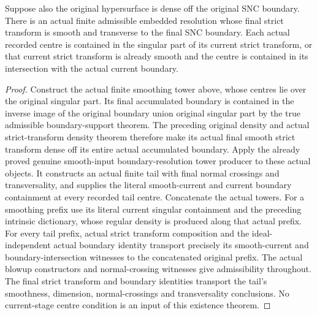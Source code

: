 \begin{theorem}
\label{hir:actual-hypersurface-embedded-stage-centres}
\leanok
{}
Suppose also the original hypersurface is dense off the original SNC
boundary. There is an actual finite admissible embedded resolution whose
final strict transform is smooth and transverse to the final SNC boundary.
Each actual recorded centre is contained in the singular part of its
current strict transform, or that current strict transform is already
smooth and the centre is contained in its intersection with the actual
current boundary.
\end{theorem}
\begin{proof}
Construct the actual finite smoothing tower above, whose centres lie
over the original singular part. Its final accumulated boundary is
contained in the inverse image of the original boundary union original
singular part by the true admissible boundary-support theorem. The
preceding original density and actual strict-transform density theorem
therefore make its actual final smooth strict transform dense off its
entire actual accumulated boundary. Apply the already proved genuine
smooth-input boundary-resolution tower producer to these actual objects.
It constructs an actual finite tail with final normal crossings and
transversality, and supplies the literal smooth-current and current
boundary containment at every recorded tail centre.
Concatenate the actual towers. For a smoothing prefix use its literal
current singular containment and the preceding intrinsic dictionary,
whose regular density is produced along that actual prefix. For every tail prefix, actual strict
transform composition and the ideal-independent actual boundary identity
transport precisely its smooth-current and boundary-intersection
witnesses to the concatenated original prefix. The actual blowup
constructors and normal-crossing witnesses give admissibility throughout.
The final strict transform and boundary identities transport the tail's
smoothness, dimension, normal-crossings and transversality conclusions.
No current-stage centre condition is an input of this existence theorem.
\end{proof}

